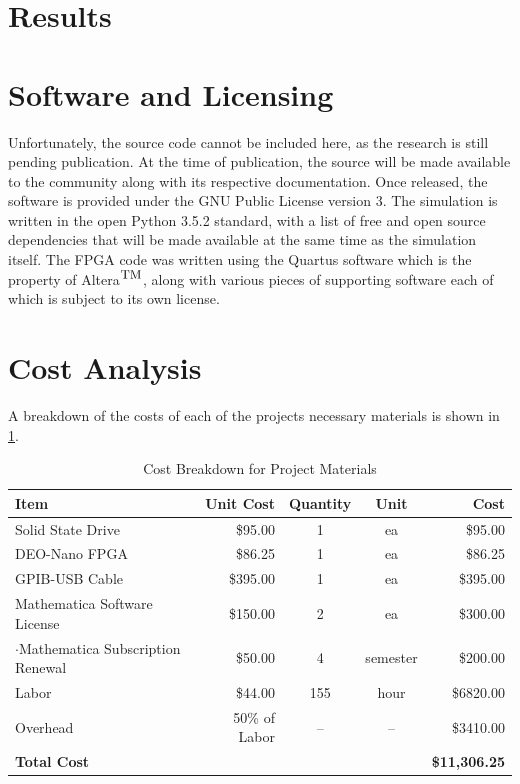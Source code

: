 \documentclass[12pt]{article}
\providecommand{\tab}{\hspace{10pt}}
\begin{document}
\section*{Results}



\section*{Software and Licensing}
Unfortunately, the source code cannot be included here, as the research is still pending publication. At the time of publication, the source will be made available to the community along with its respective documentation.
Once released, the software is provided under the GNU Public License version 3. The simulation is written in the open Python 3.5.2 standard, with a list of free and open source dependencies that will be made available at the same time as the simulation itself. The FPGA code was written using the Quartus software which is the property of Altera$^\textnormal{\small TM}$, along with various pieces of supporting software each of which is subject to its own license. 

\section*{Cost Analysis}
A breakdown of the costs of each of the projects necessary materials is shown in \ref{tbl:cost}.
\begin{table}[h]
\centering
\begin{tabular}{l|r|c|c|r}
\bf{Item} & \bf{Unit Cost} & \bf{Quantity} & \bf{Unit} & \bf{Cost}\\
\hline
Solid State Drive 				& \$95.00 	& 1 & ea 	& \$95.00\\
DEO-Nano FPGA 					& \$86.25 	& 1 & ea 	& \$86.25\\
GPIB-USB Cable					& \$395.00	& 1 & ea 	& \$395.00\\
Mathematica Software License			& \$150.00	& 2 & ea 	& \$300.00\\
\tab$\cdot$Mathematica Subscription Renewal	& \$50.00	& 4 & semester	& \$200.00\\
\hline
Labor 						& \$44.00 	&155& hour	& \$6820.00\\
Overhead	 				& 50\% of Labor	& --& -- 	& \$3410.00\\
\hline
\bf{Total Cost} & & & & \bf{\$11,306.25}
\end{tabular}
\caption{Cost Breakdown for Project Materials\label{tbl:cost}}
\end{table}
\end{document}

